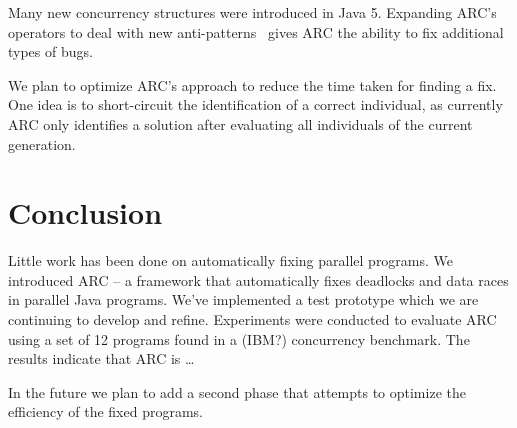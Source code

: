 \documentclass{llncs}
\begin{document}
Many new concurrency structures were introduced in Java 5. Expanding ARC's
operators to deal with new anti-patterns~\cite{BJ09, FKLV12, BCD06} gives ARC
the ability to fix additional types of bugs.

We plan to optimize ARC's approach to reduce the time taken for finding a fix.
One idea is to short-circuit the identification of a correct individual, as
currently ARC only identifies a solution after evaluating all individuals of
the current generation.

\section{Conclusion}
\label{sec:conclusion}

Little work has been done on automatically fixing parallel programs. We
introduced ARC -- a framework that automatically fixes deadlocks and data races
in parallel Java programs. We've implemented a test prototype which we are
continuing to develop and refine.  Experiments were conducted to evaluate 
ARC using a set of 12 programs found in a (IBM?) concurrency benchmark. The 
results indicate that ARC is \ldots %

In the future we plan to add a second phase that attempts to optimize the 
efficiency of the fixed programs.






\end{document}
